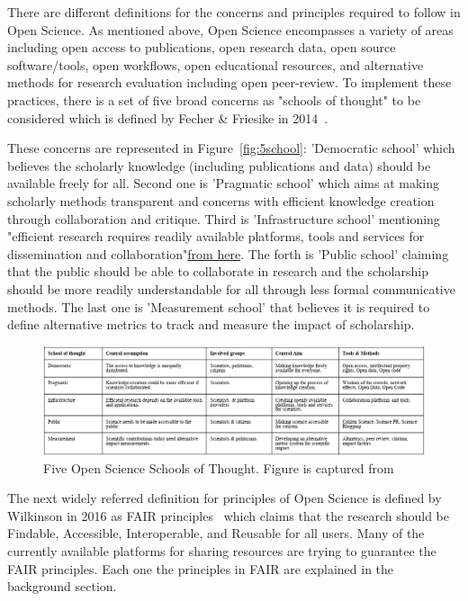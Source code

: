 There are different definitions for the concerns and principles required to follow in Open Science. As mentioned above, Open Science encompasses a variety of areas including open access to publications, open research data, open source software/tools, open workflows, open educational resources, and alternative methods for research evaluation including open peer-review\cite{pontika2015fostering}. To implement these practices, there is a set of five broad concerns as "schools of thought" to be considered which is defined by Fecher \& Friesike in 2014~\cite{fecher2014open}. 

These concerns are represented in Figure~\ref{fig:5school}: 'Democratic school' which believes the scholarly knowledge (including publications and data) should be available freely for all. Second one is 'Pragmatic school' which aims at making scholarly methods transparent and concerns with efficient knowledge creation through collaboration and critique. Third is 'Infrastructure school' mentioning "efficient research requires readily available platforms, tools and services for dissemination and collaboration"\href{https://open-science-training-handbook.gitbook.io/book/open-science-basics/open-concepts-and-principles}{from here}. The forth is 'Public school' claiming that the public should be able to collaborate in research and the scholarship should be more readily understandable for all through less formal communicative methods. The last one is 'Measurement school' that believes it is required to define alternative metrics to track and measure the impact of scholarship.

\begin{figure}[ht]
  \centering
  \includegraphics[width=\textwidth]{figures/5schools.png}
  \caption{Five Open Science Schools of Thought. Figure is captured from~\cite{fecher2014open} }
  \label{fig:5schools}
\end{figure} 


The next widely referred definition for principles of Open Science is defined by Wilkinson in 2016 as FAIR principles~\cite{wilkinson2016fair} which claims that the research should be Findable, Accessible, Interoperable, and Reusable for all users. Many of the currently available platforms for sharing resources are trying to guarantee the FAIR principles. Each one the principles in FAIR are explained in the background section.  

